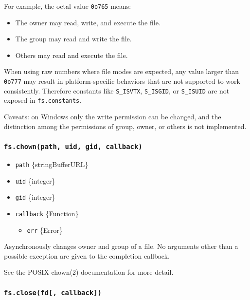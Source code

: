 For example, the octal value \texttt{0o765} means:

\begin{itemize}
\tightlist
\item
  The owner may read, write, and execute the file.
\item
  The group may read and write the file.
\item
  Others may read and execute the file.
\end{itemize}

When using raw numbers where file modes are expected, any value larger
than \texttt{0o777} may result in platform-specific behaviors that are
not supported to work consistently. Therefore constants like
\texttt{S\_ISVTX}, \texttt{S\_ISGID}, or \texttt{S\_ISUID} are not
exposed in \texttt{fs.constants}.

Caveats: on Windows only the write permission can be changed, and the
distinction among the permissions of group, owner, or others is not
implemented.

\subsubsection{\texorpdfstring{\texttt{fs.chown(path,\ uid,\ gid,\ callback)}}{fs.chown(path, uid, gid, callback)}}\label{fs.chownpath-uid-gid-callback}

\begin{itemize}
\tightlist
\item
  \texttt{path} \{string\textbar Buffer\textbar URL\}
\item
  \texttt{uid} \{integer\}
\item
  \texttt{gid} \{integer\}
\item
  \texttt{callback} \{Function\}

  \begin{itemize}
  \tightlist
  \item
    \texttt{err} \{Error\}
  \end{itemize}
\end{itemize}

Asynchronously changes owner and group of a file. No arguments other
than a possible exception are given to the completion callback.

See the POSIX chown(2) documentation for more detail.

\subsubsection{\texorpdfstring{\texttt{fs.close(fd{[},\ callback{]})}}{fs.close(fd{[}, callback{]})}}\label{fs.closefd-callback}

